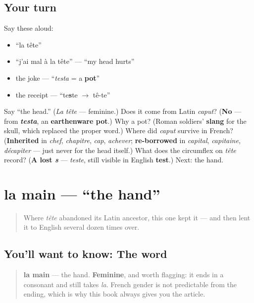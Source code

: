 \subsection*{Your turn}
Say these aloud:

\begin{itemize}
\raggedright
  \item \textquotedblleft{}la tête\textquotedblright{}
  \item \textquotedblleft{}j'ai mal à la tête\textquotedblright{} — \textquotedblleft{}my head hurts\textquotedblright{}
  \item the joke — \textquotedblleft{}\emph{testa} = a \textbf{pot}\textquotedblright{}
  \item the receipt — \textquotedblleft{}te\textbf{s}te $\to$ tê-te\textquotedblright{}
\end{itemize}

\begin{tcolorbox}[breakable,colback=teal!4,colframe=teal!35!black,title={Before you move on}]
Say \textquotedblleft{}the head.\textquotedblright{} (\emph{La tête} — feminine.) Does it come from Latin \emph{caput}? (\textbf{No} — from \emph{\textbf{testa}}, an \textbf{earthenware pot}.) Why a pot? (Roman soldiers' \textbf{slang} for the skull, which replaced the proper word.) Where did \emph{caput} survive in French? (\textbf{Inherited} in \emph{chef}, \emph{chapitre}, \emph{cap}, \emph{achever}; \textbf{re-borrowed} in \emph{capital}, \emph{capitaine}, \emph{décapiter} — just never for the head itself.) What does the circumflex on \emph{tête} record? (\textbf{A lost \emph{s}} — \emph{teste}, still visible in English \textbf{test}.) Next: the hand.
\end{tcolorbox}
\section[la main]{la main — \textquotedblleft{}the hand\textquotedblright{}}

\label{lesson:FR-C17-main}



\begin{quote}
Where \emph{tête} abandoned its Latin ancestor, this one kept it — and then lent it to English several dozen times over.
\end{quote}

\subsection*{You'll want to know: The word}
\begin{quote}
\textbf{la main} — the hand. \textbf{Feminine}, and worth flagging: it ends in a consonant and still takes \emph{la}. French gender is not predictable from the ending, which is why this book always gives you the article.
\end{quote}

